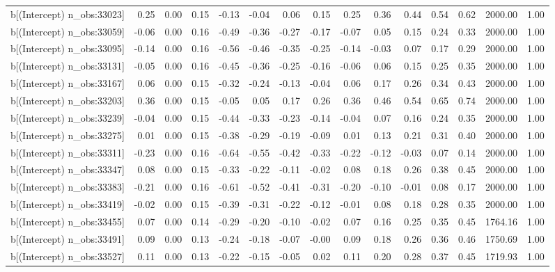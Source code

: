 \begin{table}[ht]
\begin{tabular}{rrrrrrrrrrrrrrr}
  b[(Intercept) n\_obs:33023] & 0.25 & 0.00 & 0.15 & -0.13 & -0.04 & 0.06 & 0.15 & 0.25 & 0.36 & 0.44 & 0.54 & 0.62 & 2000.00 & 1.00 \\ 
  b[(Intercept) n\_obs:33059] & -0.06 & 0.00 & 0.16 & -0.49 & -0.36 & -0.27 & -0.17 & -0.07 & 0.05 & 0.15 & 0.24 & 0.33 & 2000.00 & 1.00 \\ 
  b[(Intercept) n\_obs:33095] & -0.14 & 0.00 & 0.16 & -0.56 & -0.46 & -0.35 & -0.25 & -0.14 & -0.03 & 0.07 & 0.17 & 0.29 & 2000.00 & 1.00 \\ 
  b[(Intercept) n\_obs:33131] & -0.05 & 0.00 & 0.16 & -0.45 & -0.36 & -0.25 & -0.16 & -0.06 & 0.06 & 0.15 & 0.25 & 0.35 & 2000.00 & 1.00 \\ 
  b[(Intercept) n\_obs:33167] & 0.06 & 0.00 & 0.15 & -0.32 & -0.24 & -0.13 & -0.04 & 0.06 & 0.17 & 0.26 & 0.34 & 0.43 & 2000.00 & 1.00 \\ 
  b[(Intercept) n\_obs:33203] & 0.36 & 0.00 & 0.15 & -0.05 & 0.05 & 0.17 & 0.26 & 0.36 & 0.46 & 0.54 & 0.65 & 0.74 & 2000.00 & 1.00 \\ 
  b[(Intercept) n\_obs:33239] & -0.04 & 0.00 & 0.15 & -0.44 & -0.33 & -0.23 & -0.14 & -0.04 & 0.07 & 0.16 & 0.24 & 0.35 & 2000.00 & 1.00 \\ 
  b[(Intercept) n\_obs:33275] & 0.01 & 0.00 & 0.15 & -0.38 & -0.29 & -0.19 & -0.09 & 0.01 & 0.13 & 0.21 & 0.31 & 0.40 & 2000.00 & 1.00 \\ 
  b[(Intercept) n\_obs:33311] & -0.23 & 0.00 & 0.16 & -0.64 & -0.55 & -0.42 & -0.33 & -0.22 & -0.12 & -0.03 & 0.07 & 0.14 & 2000.00 & 1.00 \\ 
  b[(Intercept) n\_obs:33347] & 0.08 & 0.00 & 0.15 & -0.33 & -0.22 & -0.11 & -0.02 & 0.08 & 0.18 & 0.26 & 0.38 & 0.45 & 2000.00 & 1.00 \\ 
  b[(Intercept) n\_obs:33383] & -0.21 & 0.00 & 0.16 & -0.61 & -0.52 & -0.41 & -0.31 & -0.20 & -0.10 & -0.01 & 0.08 & 0.17 & 2000.00 & 1.00 \\ 
  b[(Intercept) n\_obs:33419] & -0.02 & 0.00 & 0.15 & -0.39 & -0.31 & -0.22 & -0.12 & -0.01 & 0.08 & 0.18 & 0.28 & 0.35 & 2000.00 & 1.00 \\ 
  b[(Intercept) n\_obs:33455] & 0.07 & 0.00 & 0.14 & -0.29 & -0.20 & -0.10 & -0.02 & 0.07 & 0.16 & 0.25 & 0.35 & 0.45 & 1764.16 & 1.00 \\ 
  b[(Intercept) n\_obs:33491] & 0.09 & 0.00 & 0.13 & -0.24 & -0.18 & -0.07 & -0.00 & 0.09 & 0.18 & 0.26 & 0.36 & 0.46 & 1750.69 & 1.00 \\ 
  b[(Intercept) n\_obs:33527] & 0.11 & 0.00 & 0.13 & -0.22 & -0.15 & -0.05 & 0.02 & 0.11 & 0.20 & 0.28 & 0.37 & 0.45 & 1719.93 & 1.00 \\ 

\end{tabular}
\end{table}
